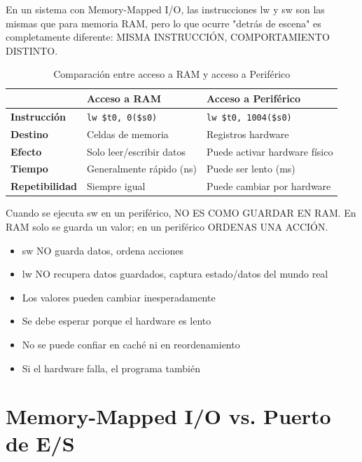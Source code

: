 \documentclass{article}
\begin{document}
En un sistema con Memory-Mapped I/O, las instrucciones lw y sw son las mismas que para memoria RAM, pero lo que ocurre "detrás de escena" es completamente diferente:  MISMA INSTRUCCIÓN, COMPORTAMIENTO DISTINTO.

\begin{table}[h]
\centering
\begin{tabular}{>{\bfseries}l p{4cm} p{4cm}}
\toprule
\multicolumn{1}{c}{\textbf{Aspecto}} & \textbf{Acceso a RAM} & \textbf{Acceso a Periférico} \\
\midrule
Instrucción & \texttt{lw \$t0, 0(\$s0)} & \texttt{lw \$t0, 1004(\$s0)} \\
Destino     & Celdas de memoria & Registros hardware \\
Efecto      & Solo leer/escribir datos & Puede activar hardware físico \\
Tiempo      & Generalmente rápido (ns) & Puede ser lento (ms) \\
Repetibilidad & Siempre igual & Puede cambiar por hardware \\
\bottomrule
\end{tabular}
\caption{Comparación entre acceso a RAM y acceso a Periférico}
\label{tab:comparacion}
\end{table}
Cuando se ejecuta sw en un periférico, NO ES COMO GUARDAR EN RAM. En RAM solo se guarda un valor; en un periférico ORDENAS UNA ACCIÓN.
\begin{itemize}
    \item sw NO guarda datos, ordena acciones

    \item lw NO recupera datos guardados, captura estado/datos del mundo real

    \item Los valores pueden cambiar inesperadamente

    \item Se debe esperar porque el hardware es lento

    \item No se puede confiar en caché ni en reordenamiento

    \item Si el hardware falla, el programa también
\end{itemize}

\section{Memory-Mapped I/O vs. Puerto de E/S}
\end{document}
